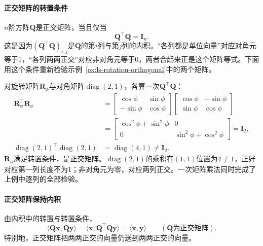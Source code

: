 \paragraph{正交矩阵的转置条件}
$n$阶方阵$\bm Q$是正交矩阵，当且仅当
\begin{equation}
 \bm Q^\top\bm Q=\bm I_n.
 \label{eq:ls-orthogonal-matrix-condition}
\end{equation}
这是因为$(\bm Q^\top\bm Q)_{i,j}$是$\bm Q$的第$i$列与第$j$列的内积。“各列都是单位向量”对应对角元等于$1$，“各列两两正交”对应非对角元等于$0$，两者合起来正是这个矩阵等式。下面用这个条件重新检验示例~\ref{ex:ls-rotation-orthogonal}中的两个矩阵。
\begin{example}[用转置条件检验正交矩阵]
\label{ex:ls-orthogonality-by-transpose}
对旋转矩阵$\bm R_\phi$与对角矩阵$\operatorname{diag}(2,1)$，各算一次$\bm Q^\top\bm Q$：
\[
 \begin{aligned}
 \bm R_\phi^\top\bm R_\phi
 &=\begin{bmatrix}\cos\phi&\sin\phi\\-\sin\phi&\cos\phi\end{bmatrix}
   \begin{bmatrix}\cos\phi&-\sin\phi\\\sin\phi&\cos\phi\end{bmatrix}\\
 &=\begin{bmatrix}\cos^2\phi+\sin^2\phi&0\\0&\sin^2\phi+\cos^2\phi\end{bmatrix}
 =\bm I_2,\\
 \operatorname{diag}(2,1)^\top\operatorname{diag}(2,1)&=\operatorname{diag}(4,1)\neq\bm I_2.
 \end{aligned}
\]
$\bm R_\phi$满足转置条件，是正交矩阵。$\operatorname{diag}(2,1)$的乘积在$(1,1)$位置为$4\neq1$，正好对应第一列长度不为$1$；非对角元为零，对应两列正交。一次矩阵乘法同时完成了上例中逐列的全部检验。
\end{example}

\paragraph{正交矩阵保持内积}
由内积中的转置与转置条件，
\[
 \langle\bm Q\bm x,\bm Q\bm y\rangle=\langle\bm x,\bm Q^\top\bm Q\bm y\rangle=\langle\bm x,\bm y\rangle\qquad(\bm Q\text{为正交矩阵}).
\]
特别地，正交矩阵把两两正交的向量仍送到两两正交的向量。

